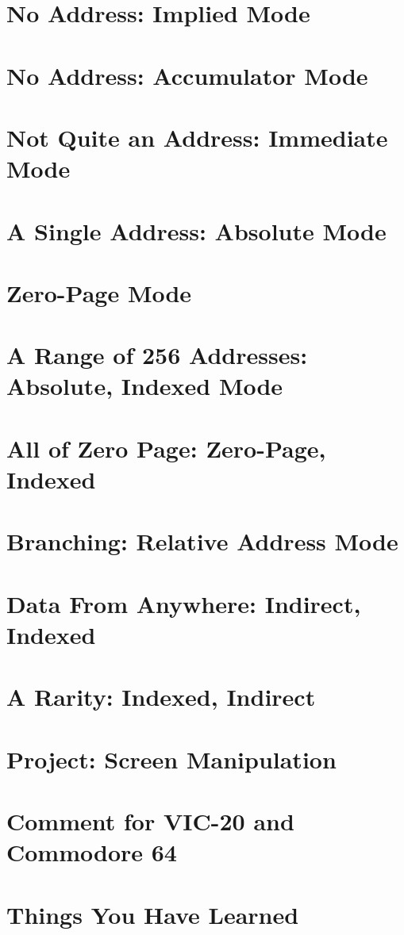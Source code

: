 \documentclass[11pt,a4paper,titlepage]{memoir}
\begin{document}
\section{No Address: Implied Mode}
\section{No Address: Accumulator Mode}
\section{Not Quite an Address: Immediate Mode}
\section{A Single Address: Absolute Mode}
\section{Zero-Page Mode}
\section{A Range of 256 Addresses: Absolute, Indexed Mode}
\section{All of Zero Page: Zero-Page, Indexed}
\section{Branching: Relative Address Mode}
\section{Data From Anywhere: Indirect, Indexed}
\section{A Rarity: Indexed, Indirect}
\section{Project: Screen Manipulation}
\section{Comment for VIC-20 and Commodore 64}
\section{Things You Have Learned}
\end{document}
